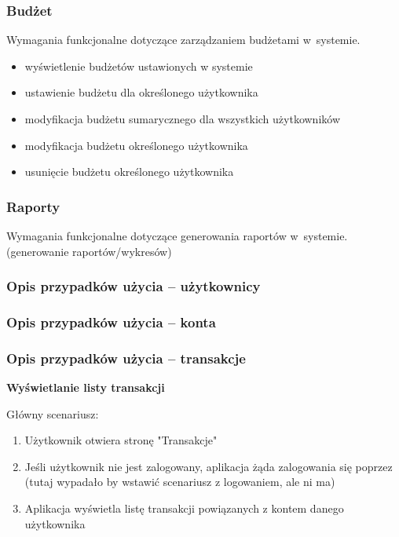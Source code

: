 \subsubsection{Budżet}
Wymagania funkcjonalne dotyczące zarządzaniem budżetami w~systemie.\\
\begin{itemize}
  \item wyświetlenie budżetów ustawionych w systemie
  \item ustawienie budżetu dla określonego użytkownika
  \item modyfikacja budżetu sumarycznego dla wszystkich użytkowników
  \item modyfikacja budżetu określonego użytkownika
  \item usunięcie budżetu określonego użytkownika
\end{itemize}

\subsubsection{Raporty}
Wymagania funkcjonalne dotyczące generowania raportów w~systemie.
(generowanie raportów/wykresów)

\subsubsection{Opis przypadków użycia -- użytkownicy}

\subsubsection{Opis przypadków użycia -- konta}

\subsubsection{Opis przypadków użycia -- transakcje}
\textbf{Wyświetlanie listy transakcji}

Główny scenariusz:

\begin{enumerate}
  \item Użytkownik otwiera stronę "Transakcje"
  \item Jeśli użytkownik nie jest zalogowany, aplikacja żąda zalogowania się poprzez (tutaj wypadało by wstawić scenariusz z logowaniem, ale ni ma)
  \item Aplikacja wyświetla listę transakcji powiązanych z kontem danego użytkownika
\end{enumerate}

